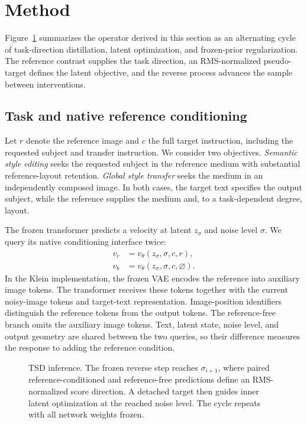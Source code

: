 \section{Method}
\label{sec:method}
Figure~\ref{fig:method} summarizes the operator derived in this section as
an alternating cycle of task-direction distillation, latent optimization,
and frozen-prior regularization. The reference contrast supplies the task
direction, an RMS-normalized pseudo-target defines the latent objective,
and the reverse process advances the sample between interventions.

\subsection{Task and native reference conditioning}
\label{sec:conditioning}
Let $r$ denote the reference image and $c$ the full target instruction,
including the requested subject and transfer instruction. We consider two
objectives. \emph{Semantic style editing} seeks the requested subject in the
reference medium with substantial reference-layout retention.
\emph{Global style transfer} seeks the medium in an independently composed
image. In both cases, the target text specifies the output subject, while the
reference supplies the medium and, to a task-dependent degree, layout.

The frozen transformer predicts a velocity at latent $z_\sigma$ and noise
level $\sigma$. We query its native conditioning interface twice:
\begin{equation}
\begin{aligned}
v_r&=v_\theta(z_\sigma,\sigma,c,r),\\
v_b&=v_\theta(z_\sigma,\sigma,c,\varnothing).
\end{aligned}
\label{eq:branches}
\end{equation}
In the Klein implementation, the frozen VAE encodes the reference into
auxiliary image tokens. The transformer receives these tokens together
with the current noisy-image tokens and target-text representation.
Image-position identifiers distinguish the reference tokens from the
output tokens. The reference-free branch omits the auxiliary image tokens.
Text, latent state, noise level, and output geometry are shared between
the two queries, so their difference measures the response to adding the
reference condition.

\begin{figure}[t]
\centering

\caption{TSD inference. The frozen reverse step reaches
$\sigma_{i+1}$, where paired reference-conditioned and reference-free
predictions define an RMS-normalized score direction. A detached target
then guides inner latent optimization at the reached noise level.
The cycle repeats with all network weights frozen.}
\label{fig:method}
\end{figure}

